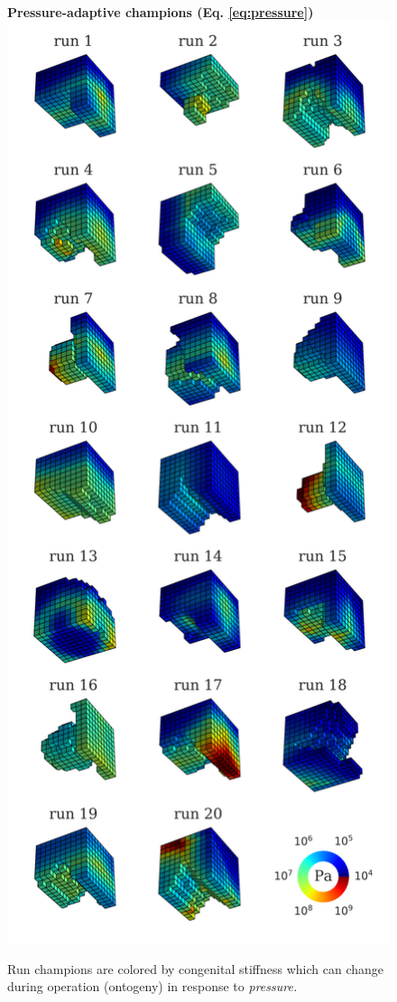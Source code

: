 \begin{figure}%
\centering
{\Large \textbf{Pressure-adaptive champions (Eq. \ref{eq:pressure})}}
\includegraphics[width=0.5\linewidth]{Chapter06/img/pressure_run_champs}
\caption{\label{fig:pressure} Run champions are colored by congenital stiffness which can change during operation (ontogeny) in response to \textit{pressure.}}
\end{figure}


